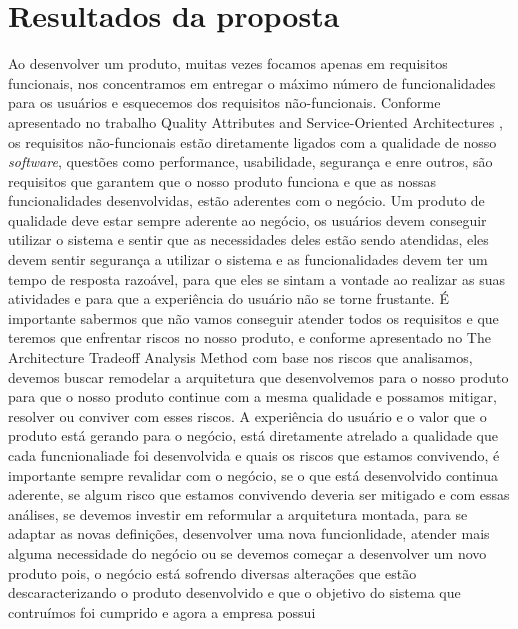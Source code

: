   \chapter{Resultados da proposta}
     Ao desenvolver um produto, muitas vezes focamos apenas em requisitos
    funcionais, nos concentramos em entregar o máximo número de funcionalidades
    para os usuários e esquecemos dos requisitos não-funcionais. Conforme apresentado
    no trabalho Quality Attributes and Service-Oriented Architectures
    \cite{O'BrienQualityAttributes2005}, os requisitos não-funcionais estão diretamente
    ligados com a qualidade de nosso \textit{software}, questões como performance,
    usabilidade, segurança e enre outros, são requisitos que garantem que o nosso
    produto funciona e que as nossas funcionalidades desenvolvidas, estão aderentes
    com o negócio. \newline
    Um produto de qualidade deve estar sempre aderente ao negócio, os usuários devem
    conseguir utilizar o sistema e sentir que as necessidades deles estão sendo
    atendidas, eles devem sentir segurança a utilizar o sistema e as funcionalidades
    devem ter um tempo de resposta razoável, para que eles se sintam a vontade ao
    realizar as suas atividades e para que a experiência do usuário não se torne
    frustante. É importante sabermos que não vamos conseguir atender todos os
    requisitos e que teremos que enfrentar riscos no nosso produto, e conforme
    apresentado no The Architecture Tradeoff Analysis Method \cite{KazmanTheArchitecture1998}
    com base nos riscos que analisamos, devemos buscar remodelar a arquitetura que
    desenvolvemos para o nosso produto para que o nosso produto continue com a
    mesma qualidade e possamos mitigar, resolver ou conviver com esses riscos.
    A experiência do usuário e o valor que o produto está gerando para o negócio,
    está diretamente atrelado a qualidade que cada funcnionaliade foi desenvolvida
    e quais os riscos que estamos convivendo, é importante sempre revalidar com o
    negócio, se o que está desenvolvido continua aderente, se algum risco que
    estamos convivendo deveria ser mitigado e com essas análises, se devemos
    investir em reformular a arquitetura montada, para se adaptar as novas definições,
    desenvolver uma nova funcionlidade, atender mais alguma necessidade do negócio
    ou se devemos começar a desenvolver um novo produto pois, o negócio está
    sofrendo diversas alterações que estão descaracterizando o produto desenvolvido
    e que o objetivo do sistema que contruímos foi cumprido e agora a empresa possui
